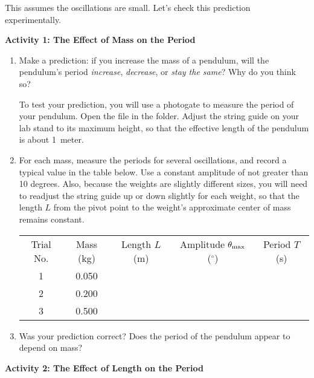 This assumes the oscillations are small. Let's check this prediction experimentally. 

\bigskip
\textbf{Activity 1: The Effect of Mass on the Period} 

\begin{enumerate}[labparts]

\item Make a prediction: if you increase the mass of a pendulum, will the pendulum's period \textit{increase}, \textit{decrease}, or \textit{stay the same}?  Why do you think so?
\answerspace{0.8in}

To test your prediction, you will use a photogate to measure the period of your pendulum.  
Open the file  in the \filename{\coursefolder} folder.  
Adjust the string guide on your lab stand to its maximum height, so that the effective length of the pendulum is about 1~meter. 

\item For each mass, measure the periods for several oscillations, and record a typical value in the table below.  Use a constant amplitude of not greater than 10 degrees.  Also, because the weights are slightly different sizes, you will need to readjust the string guide up or down slightly for each weight, so that the length $L$ from the pivot point to the weight's approximate center of mass remains constant.  

\begin{center}
{\renewcommand{\arraystretch}{1.8}
\begin{tabular}{|c|c|c|c|c|} \hline 
Trial No. & Mass (kg) & Length $L$ (m) & Amplitude $\theta_{\rm max}$ ($^\circ$) & Period $T$ (s) \\ 
\hhline{|=|=|=|=|=|}
1 & 0.050 & & & \\ \hline 
2 & 0.200 & & & \\ \hline 
3 & 0.500 & & & \\ \hline 
\end{tabular} }
\end{center}

\item Was your prediction correct?  Does the period of the pendulum appear to depend on mass?
\answerspace{0.8in}

\end{enumerate}

\textbf{Activity 2: The Effect of Length on the Period} 

